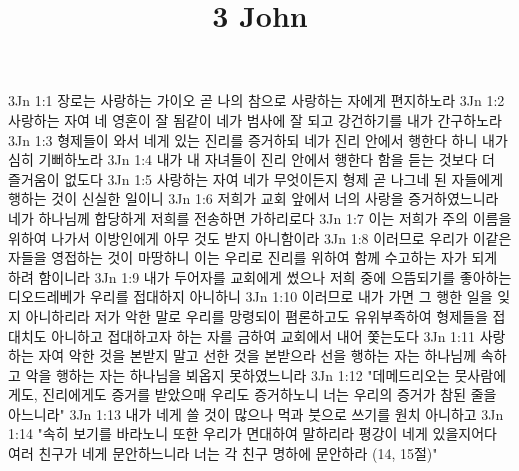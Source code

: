 

\title{3 John}

3Jn 1:1  장로는 사랑하는 가이오 곧 나의 참으로 사랑하는 자에게 편지하노라
3Jn 1:2  사랑하는 자여 네 영혼이 잘 됨같이 네가 범사에 잘 되고 강건하기를 내가 간구하노라
3Jn 1:3  형제들이 와서 네게 있는 진리를 증거하되 네가 진리 안에서 행한다 하니 내가 심히 기뻐하노라
3Jn 1:4  내가 내 자녀들이 진리 안에서 행한다 함을 듣는 것보다 더 즐거움이 없도다
3Jn 1:5  사랑하는 자여 네가 무엇이든지 형제 곧 나그네 된 자들에게 행하는 것이 신실한 일이니
3Jn 1:6  저희가 교회 앞에서 너의 사랑을 증거하였느니라 네가 하나님께 합당하게 저희를 전송하면 가하리로다
3Jn 1:7  이는 저희가 주의 이름을 위하여 나가서 이방인에게 아무 것도 받지 아니함이라
3Jn 1:8  이러므로 우리가 이같은 자들을 영접하는 것이 마땅하니 이는 우리로 진리를 위하여 함께 수고하는 자가 되게 하려 함이니라
3Jn 1:9  내가 두어자를 교회에게 썼으나 저희 중에 으뜸되기를 좋아하는 디오드레베가 우리를 접대하지 아니하니
3Jn 1:10  이러므로 내가 가면 그 행한 일을 잊지 아니하리라 저가 악한 말로 우리를 망령되이 폄론하고도 유위부족하여 형제들을 접대치도 아니하고 접대하고자 하는 자를 금하여 교회에서 내어 쫓는도다
3Jn 1:11  사랑하는 자여 악한 것을 본받지 말고 선한 것을 본받으라 선을 행하는 자는 하나님께 속하고 악을 행하는 자는 하나님을 뵈옵지 못하였느니라
3Jn 1:12  "데메드리오는 뭇사람에게도, 진리에게도 증거를 받았으매 우리도 증거하노니 너는 우리의 증거가 참된 줄을 아느니라"
3Jn 1:13  내가 네게 쓸 것이 많으나 먹과 붓으로 쓰기를 원치 아니하고
3Jn 1:14  "속히 보기를 바라노니 또한 우리가 면대하여 말하리라 평강이 네게 있을지어다 여러 친구가 네게 문안하느니라 너는 각 친구 명하에 문안하라 (14, 15절)"


